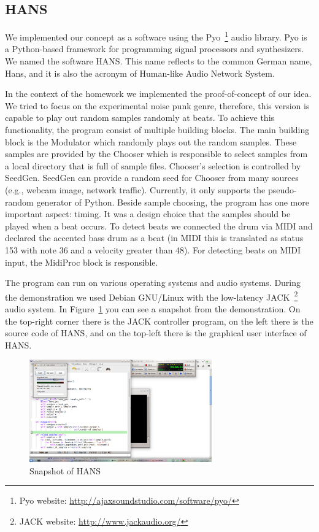\documentclass[12pt,a4paper,oneside]{report}
\begin{document}
\subsection*{HANS}
We implemented our concept as a software using the Pyo~\footnote{Pyo
  website: {\small \url{http://ajaxsoundstudio.com/software/pyo/}}}
audio library. Pyo is a Python-based framework for programming signal
processors and synthesizers. We named the software HANS. This name
reflects to the common German name, Hans, and it is also the acronym
of Human-like Audio Network System.

In the context of the homework we implemented the proof-of-concept of
our idea. We tried to focus on the experimental noise punk genre,
therefore, this version is capable to play out random samples randomly
at beats.  To achieve this functionality, the program consist of
multiple building blocks. The main building block is the Modulator
which randomly plays out the random samples. These samples are
provided by the Chooser which is responsible to select samples from a
local directory that is full of sample files. Chooser's selection is
controlled by SeedGen. SeedGen can provide a random seed for Chooser
from many sources (e.g., webcam image, network traffic). Currently, it
only supports the pseudo-random generator of Python. Beside sample
choosing, the program has one more important aspect: timing. It was a
design choice that the samples should be played when a beat occurs. To
detect beats we connected the drum via MIDI and declared the accented
bass drum as a beat (in MIDI this is translated as status 153 with
note 36 and a velocity greater than 48). For detecting beats on MIDI
input, the MidiProc block is responsible.

The program can run on various operating systems and audio
systems. During the demonstration we used Debian GNU/Linux with the
low-latency JACK~\footnote{JACK website: {\small
    \url{http://www.jackaudio.org/}}} audio system. In
Figure~\ref{fig:hans_screen} you can see a snapshot from the
demonstration. On the top-right corner there is the JACK controller
program, on the left there is the source code of HANS, and on the
top-left there is the graphical user interface of HANS.

\begin{figure}[h!]
\centering
\includegraphics[width=0.7\textwidth]{snapshot.jpg}
\caption{Snapshot of HANS}
\label{fig:hans_screen}
\end{figure}
\end{document}
